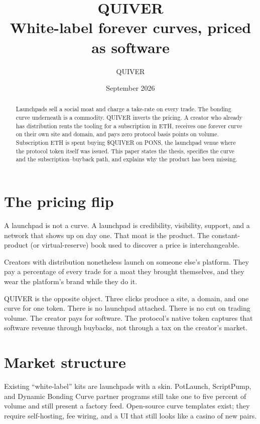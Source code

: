\documentclass[11pt,a4paper]{article}
\title{\textbf{QUIVER}\\[0.4em]
\large White-label forever curves, priced as software}
\author{QUIVER}
\date{September 2026}
\begin{document}
\maketitle

\begin{abstract}
Launchpads sell a social moat and charge a take-rate on every trade. The bonding curve underneath is a commodity. QUIVER inverts the pricing. A creator who already has distribution rents the tooling for a subscription in ETH, receives one forever curve on their own site and domain, and pays zero protocol basis points on volume. Subscription ETH is spent buying \$QUIVER on PONS, the launchpad venue where the protocol token itself was issued. This paper states the thesis, specifies the curve and the subscription--buyback path, and explains why the product has been missing.
\end{abstract}

\tableofcontents
\vspace{1em}

\section{The pricing flip}

A launchpad is not a curve. A launchpad is credibility, visibility, support, and a network that shows up on day one. That moat is the product. The constant-product (or virtual-reserve) book used to discover a price is interchangeable.

Creators with distribution nonetheless launch on someone else's platform. They pay a percentage of every trade for a moat they brought themselves, and they wear the platform's brand while they do it.

QUIVER is the opposite object. Three clicks produce a site, a domain, and one curve for one token. There is no launchpad attached. There is no cut on trading volume. The creator pays for software. The protocol's native token captures that software revenue through buybacks, not through a tax on the creator's market.

\section{Market structure}

Existing ``white-label'' kits are launchpads with a skin. PotLaunch, ScriptPump, and Dynamic Bonding Curve partner programs still take one to five percent of volume and still present a factory feed. Open-source curve templates exist; they require self-hosting, fee wiring, and a UI that still looks like a casino of new pairs.
\end{document}
